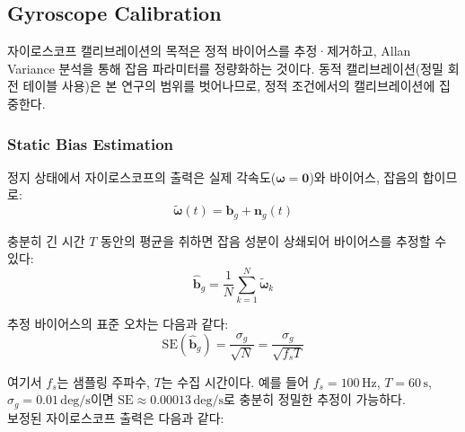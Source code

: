     \subsection{Gyroscope Calibration}
        자이로스코프 캘리브레이션의 목적은 정적 바이어스를 추정·제거하고, Allan Variance 분석을 통해 잡음 파라미터를 정량화하는 것이다. 동적 캘리브레이션(정밀 회전 테이블 사용)은 본 연구의 범위를 벗어나므로, 정적 조건에서의 캘리브레이션에 집중한다.\\

        \subsubsection{Static Bias Estimation}
            정지 상태에서 자이로스코프의 출력은 실제 각속도($\boldsymbol{\omega} = \mathbf{0}$)와 바이어스, 잡음의 합이므로:\\

            \begin{equation}
                \tilde{\boldsymbol{\omega}}(t) = \mathbf{b}_g + \mathbf{n}_g(t)
                \label{eq:gyro_static}
            \end{equation}

            충분히 긴 시간 $T$ 동안의 평균을 취하면 잡음 성분이 상쇄되어 바이어스를 추정할 수 있다:\\

            \begin{equation}
                \hat{\mathbf{b}}_g = \frac{1}{N} \sum_{k=1}^{N} \tilde{\boldsymbol{\omega}}_k
                \label{eq:gyro_bias_est}
            \end{equation}

            추정 바이어스의 표준 오차는 다음과 같다:\\

            \begin{equation}
                \text{SE}(\hat{\mathbf{b}}_g) = \frac{\sigma_g}{\sqrt{N}} = \frac{\sigma_g}{\sqrt{f_s T}}
                \label{eq:gyro_bias_se}
            \end{equation}

            \noindent 여기서 $f_s$는 샘플링 주파수, $T$는 수집 시간이다. 예를 들어 $f_s = 100\,\text{Hz}$, $T = 60\,\text{s}$, $\sigma_g = 0.01\,\text{deg/s}$이면 $\text{SE} \approx 0.00013\,\text{deg/s}$로 충분히 정밀한 추정이 가능하다.\\

            보정된 자이로스코프 출력은 다음과 같다:\\

